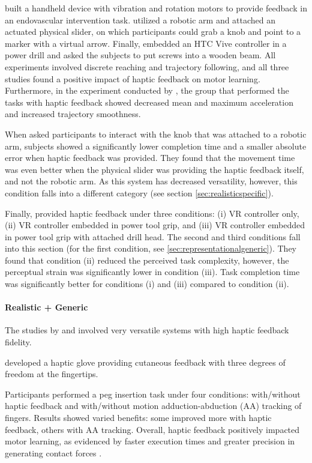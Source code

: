 \cite{Chi2017} built a handheld device with vibration and rotation motors to provide feedback in an endovascular intervention task. \cite{Dai2023} utilized a robotic arm and attached an actuated physical slider, on which participants could grab a knob and point to a marker with a virtual arrow. Finally, \cite{Yang2023} embedded an HTC Vive controller in a power drill and asked the subjects to put screws into a wooden beam. All experiments involved discrete reaching and trajectory following, and all three studies found a positive impact of haptic feedback on motor learning. 
Furthermore, in the experiment conducted by \cite{Chi2017}, the group that performed the tasks with haptic feedback showed decreased mean and maximum acceleration and increased trajectory smoothness. 

When \cite{Dai2023} asked participants to interact with the knob that was attached to a robotic arm, subjects showed a significantly lower completion time and a smaller absolute error when haptic feedback was provided. They found that the movement time was even better when the physical slider was providing the haptic feedback itself, and not the robotic arm. As this system has decreased versatility, however, this condition falls into a different category (see section \ref{sec:realisticspecific}). 

Finally, \cite{Yang2023} provided haptic feedback under three conditions: (i) VR controller only, (ii) VR controller embedded in power tool grip, and (iii) VR controller embedded in power tool grip with attached drill head. The second and third conditions fall into this section (for the first condition, see \ref{sec:representationalgeneric}). They found that condition (ii) reduced the perceived task complexity, however, the perceptual strain was significantly lower in condition (iii). Task completion time was significantly better for conditions (i) and (iii) compared to condition (ii).


\paragraph{Realistic + Generic} \label{sec:realisticgeneric}
The studies by \cite{LeeY2019} and \cite{Oezen2022} involved very versatile systems with high haptic feedback fidelity. 

\cite{LeeY2019} developed a haptic glove providing cutaneous feedback with three degrees of freedom at the fingertips. 

Participants performed a peg insertion task under four conditions: with/without haptic feedback and with/without motion adduction-abduction (AA) tracking of fingers. Results showed varied benefits: some improved more with haptic feedback, others with AA tracking. Overall, haptic feedback positively impacted motor learning, as evidenced by faster execution times and greater precision in generating contact forces \cite{LeeY2019}.


